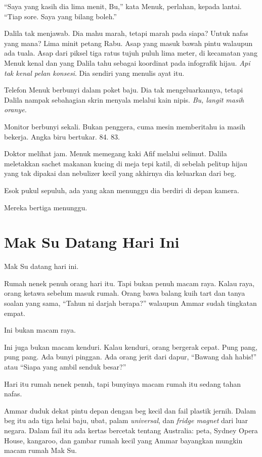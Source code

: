 \documentclass[
  11pt,
  a5paper,
  openany,
  oneside]{book}
\begin{document}
``Saya yang kasih dia lima menit, Bu,'' kata Menuk, perlahan, kepada
lantai. ``Tiap sore. Saya yang bilang boleh.''

Dalila tak menjawab. Dia mahu marah, tetapi marah pada siapa? Untuk
nafas yang mana? Lima minit petang Rabu. Asap yang masuk bawah pintu
walaupun ada tuala. Asap dari piksel tiga ratus tujuh puluh lima meter,
di kecamatan yang Menuk kenal dan yang Dalila tahu sebagai koordinat
pada infografik hijau. \emph{Api tak kenal pelan konsesi}. Dia sendiri
yang menulis ayat itu.

Telefon Menuk berbunyi dalam poket baju. Dia tak mengeluarkannya, tetapi
Dalila nampak sebahagian skrin menyala melalui kain nipis. \emph{Bu,
langit masih oranye.}

Monitor berbunyi sekali. Bukan penggera, cuma mesin memberitahu ia masih
bekerja. Angka biru bertukar. 84. 83.

Doktor melihat jam. Menuk memegang kaki Afif melalui selimut. Dalila
meletakkan sachet makanan kucing di meja tepi katil, di sebelah pelitup
hijau yang tak dipakai dan nebulizer kecil yang akhirnya dia keluarkan
dari beg.

Esok pukul sepuluh, ada yang akan menunggu dia berdiri di depan kamera.

Mereka bertiga menunggu.

\chapter{Mak Su Datang Hari Ini}\label{mak-su-datang-hari-ini}

Mak Su datang hari ini.

Rumah nenek penuh orang hari itu. Tapi bukan penuh macam raya. Kalau
raya, orang ketawa sebelum masuk rumah. Orang bawa balang kuih tart dan
tanya soalan yang sama, ``Tahun ni darjah berapa?'' walaupun Ammar sudah
tingkatan empat.

Ini bukan macam raya.

Ini juga bukan macam kenduri. Kalau kenduri, orang bergerak cepat. Pung
pang, pung pang. Ada bunyi pinggan. Ada orang jerit dari dapur, ``Bawang
dah habis!'' atau ``Siapa yang ambil senduk besar?''

Hari itu rumah nenek penuh, tapi bunyinya macam rumah itu sedang tahan
nafas.

Ammar duduk dekat pintu depan dengan beg kecil dan fail plastik jernih.
Dalam beg itu ada tiga helai baju, ubat, palam \emph{universal}, dan
\emph{fridge magnet} dari luar negara. Dalam fail itu ada kertas
bercetak tentang Australia: peta, Sydney Opera House, kangaroo, dan
gambar rumah kecil yang Ammar bayangkan mungkin macam rumah Mak Su.
\end{document}
